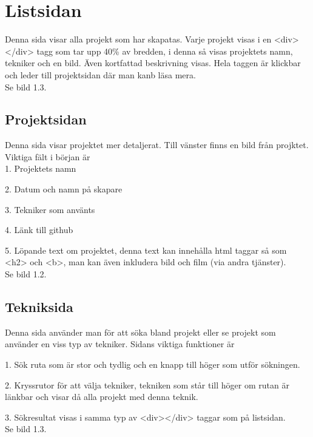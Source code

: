 \documentclass{TDP003mall}
\begin{document}
\section{Listsidan}
Denna sida visar alla projekt som har skapatas. Varje projekt visas i en <div></div> tagg som tar upp 40\% av bredden, i denna så visas projektets 
namn, tekniker och en bild. Även kortfattad beskrivning visas. Hela taggen är klickbar och leder till projektsidan där man kanb läsa mera.\\
Se bild 1.3.

\subsection{Projektsidan}
Denna sida visar projektet mer detaljerat. Till vänster finns en bild från projktet. Viktiga fält i början är \\

1. Projektets namn 

2. Datum och namn på skapare

3. Tekniker som använts 

4. Länk till github

5. Löpande text om projektet, denna text kan innehålla html taggar så som <h2> och <b>, man kan även inkludera bild och film (via andra tjänster).\\
Se bild 1.2.

\subsection{Tekniksida}
Denna sida använder man för att söka bland projekt eller se projekt som använder en viss typ av tekniker. Sidans viktiga funktioner är

1. Sök ruta som är stor och tydlig och en knapp till höger som utför sökningen. 

2. Kryssrutor för att välja tekniker, tekniken som står till höger om rutan är länkbar och visar då alla projekt med denna teknik. 

3. Sökresultat visas i samma typ av <div></div> taggar som på listsidan.\\
Se bild 1.3.
 
\clearpage
\end{document}
